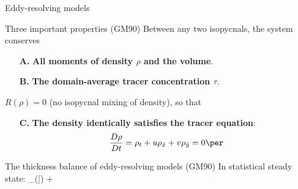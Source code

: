 \documentclass{beamer}
\begin{document}
\begin{frame}{Eddy-resolving models}
\vspace{-.125cm}
\begin{exampleblock}{Three important properties (GM90)}
Between any two isopycnals, the system conserves

\begin{enumerate}
\item [\bf A.] {\bf All moments of density $\rho$ and the volume}.
\item [\bf B.] {\bf The domain-average tracer concentration $\tau$}.
\end{enumerate}

$R(\rho) = 0$ (no isopycnal mixing of density), so that

\begin{enumerate}
\item [\bf C.] {\bf The density identically satisfies the tracer equation}:
\vspace{-.275cm}
 $$\frac{D \rho}{D t} = \rho_t + u\rho_{\tilde x} + v\rho_{\tilde y}= 0\per$$
\end{enumerate}

\end{exampleblock}


\begin{block}{The thickness balance of eddy-resolving models (GM90)}
In statistical steady state:
\vspace{-.2cm}
\beq{}
\nabla_{\!\!\rho}\cdot \left(\bar{}\right)
 +  \com
\eeq
\end{block}

\end{frame}
\end{document}

